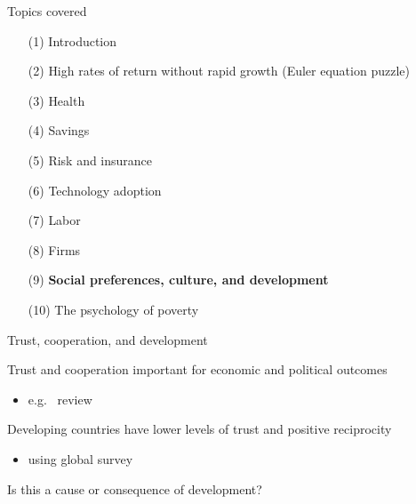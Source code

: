 \documentclass[aspectratio=169, 10pt, handout]{beamer}
\newenvironment{wideitemize}{\itemize\addtolength{\itemsep}{10pt}}{\enditemize}
\begin{document}
\begin{frame}{Topics covered}

\small 

\begin{enumerate}[(1)]

	\item[(1)] Introduction 
	
	\item[(2)] {High rates of return without rapid growth (Euler equation puzzle)}

	\item[(3)] {Health}
	
	\item[(4)] {Savings}
		
	\item[(5)] {Risk and insurance}

	\item[(6)] {Technology adoption}
	
	\item[(7)] {Labor}

	\item[(8)] Firms
	
	\item[(9)] \textbf{Social preferences, culture, and development}
	
	\item[(10)] The psychology of poverty

\end{enumerate}

\end{frame}


\begin{frame}{Trust, cooperation, and development}

\begin{wideitemize}

	\item Trust and cooperation important for economic and political outcomes 

	\begin{itemize}
	
		\item e.g.\ \cite{algan2014trust} review

	\end{itemize}

	\item Developing countries have lower levels of trust and positive reciprocity 

	\begin{itemize}
	
		\item \cite{falk2018global} using global survey 

	\end{itemize}
	
	\item Is this a cause or consequence of development?

	
\end{wideitemize}

\end{frame}
\end{document}
